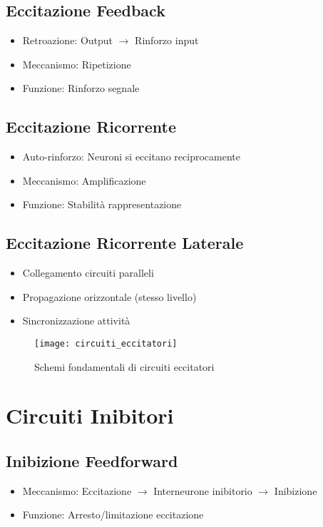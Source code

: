 \documentclass[12pt]{article}
\begin{document}
\subsection{Eccitazione Feedback}
\begin{itemize}
    \item Retroazione: Output $\rightarrow$ Rinforzo input
    \item Meccanismo: Ripetizione
    \item Funzione: Rinforzo segnale
\end{itemize}

\subsection{Eccitazione Ricorrente}
\begin{itemize}
    \item Auto-rinforzo: Neuroni si eccitano reciprocamente
    \item Meccanismo: Amplificazione
    \item Funzione: Stabilità rappresentazione
\end{itemize}

\subsection{Eccitazione Ricorrente Laterale}
\begin{itemize}
    \item Collegamento circuiti paralleli
    \item Propagazione orizzontale (stesso livello)
    \item Sincronizzazione attività
\end{itemize}

\begin{figure}[h]
    \centering
    \texttt{[image: circuiti\_eccitatori]}
    \caption{Schemi fondamentali di circuiti eccitatori}
\end{figure}

\section{Circuiti Inibitori}
\subsection{Inibizione Feedforward}
\begin{itemize}
    \item Meccanismo: Eccitazione $\rightarrow$ Interneurone inibitorio $\rightarrow$ Inibizione
    \item Funzione: Arresto/limitazione eccitazione
\end{itemize}
\end{document}
